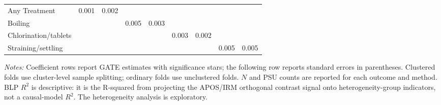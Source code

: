 \begin{landscape}
\begin{table}[p]
\begin{adjustbox}{max width=\linewidth, center}
\begin{tabular}{lcccccccc}
\quad Any Treatment & 0.001 & 0.002 &  &  &  &  &  &  \\
\quad Boiling &  &  & 0.005 & 0.003 &  &  &  &  \\
\quad Chlorination/tablets &  &  &  &  & 0.003 & 0.002 &  &  \\
\quad Straining/settling &  &  &  &  &  &  & 0.005 & 0.005 \\
\bottomrule
\end{tabular}
\end{adjustbox}
\par\vspace{3pt}
\begin{minipage}{\linewidth}\footnotesize \textit{Notes:} Coefficient rows report GATE estimates with significance stars; the following row reports standard errors in parentheses. Clustered folds use cluster-level sample splitting; ordinary folds use unclustered folds. $N$ and PSU counts are reported for each outcome and method. BLP $R^2$ is descriptive: it is the R-squared from projecting the APOS/IRM orthogonal contrast signal onto heterogeneity-group indicators, not a causal-model $R^2$. The heterogeneity analysis is exploratory.\end{minipage}
\end{table}
\end{landscape}